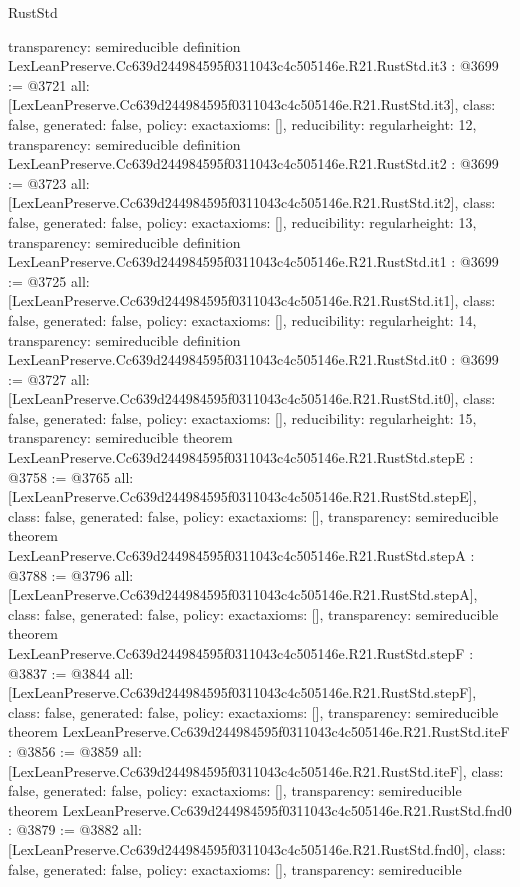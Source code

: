 \begin{lexlean}{RustStd}
\begin{coremodule}
{  transparency: semireducible
}
definition LexLeanPreserve.Cc639d244984595f0311043c4c505146e.R21.RustStd.it3 : @3699 := @3721 {
  all: [LexLeanPreserve.Cc639d244984595f0311043c4c505146e.R21.RustStd.it3],
  class: false,
  generated: false,
  policy: exact{axioms: []},
  reducibility: regular{height: 12},
  transparency: semireducible
}
definition LexLeanPreserve.Cc639d244984595f0311043c4c505146e.R21.RustStd.it2 : @3699 := @3723 {
  all: [LexLeanPreserve.Cc639d244984595f0311043c4c505146e.R21.RustStd.it2],
  class: false,
  generated: false,
  policy: exact{axioms: []},
  reducibility: regular{height: 13},
  transparency: semireducible
}
definition LexLeanPreserve.Cc639d244984595f0311043c4c505146e.R21.RustStd.it1 : @3699 := @3725 {
  all: [LexLeanPreserve.Cc639d244984595f0311043c4c505146e.R21.RustStd.it1],
  class: false,
  generated: false,
  policy: exact{axioms: []},
  reducibility: regular{height: 14},
  transparency: semireducible
}
definition LexLeanPreserve.Cc639d244984595f0311043c4c505146e.R21.RustStd.it0 : @3699 := @3727 {
  all: [LexLeanPreserve.Cc639d244984595f0311043c4c505146e.R21.RustStd.it0],
  class: false,
  generated: false,
  policy: exact{axioms: []},
  reducibility: regular{height: 15},
  transparency: semireducible
}
theorem LexLeanPreserve.Cc639d244984595f0311043c4c505146e.R21.RustStd.stepE : @3758 := @3765 {
  all: [LexLeanPreserve.Cc639d244984595f0311043c4c505146e.R21.RustStd.stepE],
  class: false,
  generated: false,
  policy: exact{axioms: []},
  transparency: semireducible
}
theorem LexLeanPreserve.Cc639d244984595f0311043c4c505146e.R21.RustStd.stepA : @3788 := @3796 {
  all: [LexLeanPreserve.Cc639d244984595f0311043c4c505146e.R21.RustStd.stepA],
  class: false,
  generated: false,
  policy: exact{axioms: []},
  transparency: semireducible
}
theorem LexLeanPreserve.Cc639d244984595f0311043c4c505146e.R21.RustStd.stepF : @3837 := @3844 {
  all: [LexLeanPreserve.Cc639d244984595f0311043c4c505146e.R21.RustStd.stepF],
  class: false,
  generated: false,
  policy: exact{axioms: []},
  transparency: semireducible
}
theorem LexLeanPreserve.Cc639d244984595f0311043c4c505146e.R21.RustStd.iteF : @3856 := @3859 {
  all: [LexLeanPreserve.Cc639d244984595f0311043c4c505146e.R21.RustStd.iteF],
  class: false,
  generated: false,
  policy: exact{axioms: []},
  transparency: semireducible
}
theorem LexLeanPreserve.Cc639d244984595f0311043c4c505146e.R21.RustStd.fnd0 : @3879 := @3882 {
  all: [LexLeanPreserve.Cc639d244984595f0311043c4c505146e.R21.RustStd.fnd0],
  class: false,
  generated: false,
  policy: exact{axioms: []},
  transparency: semireducible
}
\end{coremodule}
\end{lexlean}
